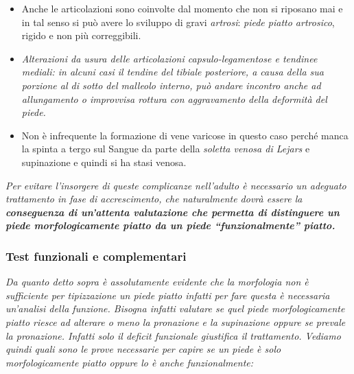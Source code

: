 \begin{itemize}
\item
  Anche le articolazioni sono coinvolte dal momento che non si riposano mai e in tal senso si può avere lo sviluppo di gravi \emph{artrosi}: \emph{\emph{piede piatto artrosico}}, rigido e non più correggibili.

\item
  \emph{Alterazioni da usura delle \emph{articolazioni capsulo-legamentose e tendinee mediali}: in alcuni casi il tendine del tibiale posteriore, a causa della sua porzione al di sotto del malleolo interno, può andare incontro anche ad allungamento o improvvisa rottura con aggravamento della deformità del piede. }

\item
  Non è infrequente la formazione di vene varicose in questo caso perché manca la spinta a tergo sul Sangue da parte della \emph{soletta venosa di Lejars} e supinazione e quindi si ha stasi venosa.
\end{itemize}

\emph{Per evitare l'insorgere di queste complicanze nell'adulto è necessario un \emph{adeguato trattamento in fase di accrescimento}, che naturalmente dovrà essere la \textbf{\emph{conseguenza di un'attenta valutazione che permetta di distinguere un piede morfologicamente piatto
da un piede ``funzionalmente'' piatto.}}}

\subsubsection{Test funzionali e complementari}

\emph{Da quanto detto sopra è assolutamente evidente che la morfologia non è sufficiente per tipizzazione un piede piatto infatti per fare questa è necessaria un'analisi della funzione. Bisogna infatti valutare se quel piede morfologicamente piatto riesce ad alterare o meno la pronazione e la supinazione oppure se prevale la pronazione. Infatti solo il deficit funzionale giustifica il trattamento. Vediamo quindi quali sono le prove necessarie per capire se un piede è solo morfologicamente piatto oppure lo è anche funzionalmente:}

